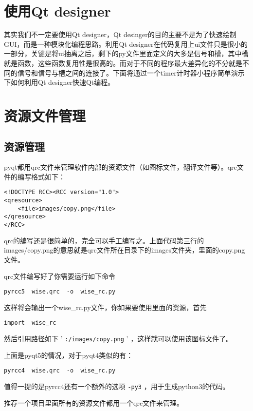 \documentclass[11pt,oneside]{article}
\begin{document}
\section{使用Qt designer}
\label{sec:orgheadline24}
其实我们不一定要使用Qt designer，Qt desinger的目的主要不是为了快速绘制GUI，而是一种模块化编程思路。利用Qt designer在代码复用上ui文件只是很小的一部分，关键是将ui抽离之后，剩下的py文件里面定义的大多是信号和槽，其中槽就是函数，这些函数复用性是很高的。而对于不同的程序最大差异化的不分就是不同的信号和信号与槽之间的连接了。下面将通过一个timer计时器小程序简单演示下如何利用Qt designer快速Qt编程。



\section{资源文件管理}
\label{sec:orgheadline26}
\subsection{资源管理}
\label{sec:orgheadline25}
pyqt都用qrc文件来管理软件内部的资源文件（如图标文件，翻译文件等）。qrc文件的编写格式如下：
\begin{verbatim}
<!DOCTYPE RCC><RCC version="1.0">
<qresource>
    <file>images/copy.png</file>
</qresource>
</RCC>
\end{verbatim}

qrc的编写还是很简单的，完全可以手工编写之。上面代码第三行的images/copy.png的意思就是qrc文件所在目录下的images文件夹，里面的copy.png文件。

qrc文件编写好了你需要运行如下命令
\begin{verbatim}
pyrcc5  wise.qrc  -o  wise_rc.py
\end{verbatim}

这样将会输出一个wise\_rc.py文件，你如果要使用里面的资源，首先
\begin{verbatim}
import  wise_rc
\end{verbatim}

然后引用路径如下 ' \texttt{:/images/copy.png} ' ，这样就可以使用该图标文件了。

上面是pyqt5的情况，对于pyqt4类似的有：
\begin{verbatim}
pyrcc4  wise.qrc  -o  wise_rc.py
\end{verbatim}

值得一提的是pyrcc4还有一个额外的选项 \texttt{-py3} ，用于生成python3的代码。

推荐一个项目里面所有的资源文件都用一个qrc文件来管理。
\end{document}
